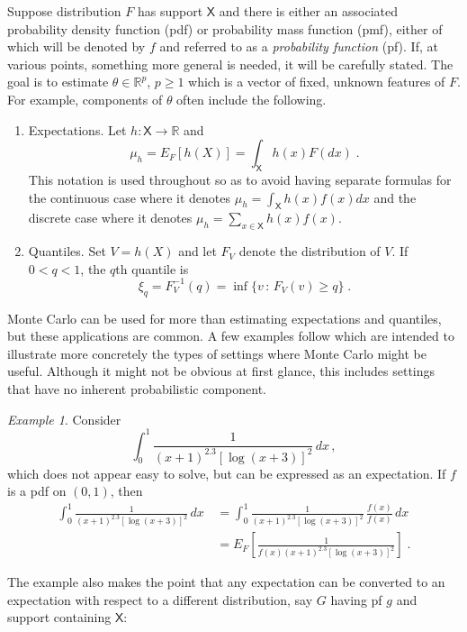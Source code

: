 \documentclass[12pt]{article}
\theoremstyle{plain}
\theoremstyle{definition}
\theoremstyle{remark}
\newtheorem{example}{Example}[section]
\newcommand{\sX}{\mathsf{X}}
\newcommand{\real}{\mathbb{R}}
\begin{document}
Suppose distribution $F$ has support $\sX$ and there is either an
associated probability density function (pdf) or probability mass
function (pmf), either of which will be denoted by $f$ and referred to
as a \textit{probability function} (pf).  If, at various points,
something more general is needed, it will be carefully stated.  The
goal is to estimate $\theta \in \mathbb{R}^p$, $p \ge 1$ which is a
vector of fixed, unknown features of $F$.  For example, components of
$\theta$ often include the following.
\begin{enumerate}
\item Expectations.  Let $h : \sX \to \real$ and 
\[
\mu_h = E_{F}[h(X)] = \int_{\sX} h(x) F(dx) \; .
\]
This notation is used throughout so as to avoid having
separate formulas for the continuous case where it denotes $\mu_{h} =
\int_{\sX} h(x) f(x) dx$ and the discrete case where it denotes
$\mu_{h} = \sum_{x \in \sX} h(x) f(x)$.

\item Quantiles.  Set $V=h(X)$ and let $F_V$ denote the distribution
  of $V$.  If $0 < q < 1$, the $q$th quantile is
\[
\xi_{q} = F_{V}^{-1}(q) = \inf \{ v \, : \, F_{V}(v) \ge q\} \; .
\]

\end{enumerate}
Monte Carlo can be used for more than estimating expectations and
quantiles, but these applications are common.  A few examples follow
which are intended to illustrate more concretely the types of
settings where Monte Carlo might be useful.  Although it might not be
obvious at first glance, this includes settings that have no inherent
probabilistic component.

\begin{example}
\label{gofmc:ex:integral}
Consider
\[
\int_{0}^{1} \frac{1}{(x+1)^{2.3} [\log ( x+3)]^{2}}\,  dx \, ,
\]
which does not appear easy to solve, but can be expressed as an
expectation.  If $f$ is a pdf on $(0,1)$, then
\begin{align*}
\int_{0}^{1} \frac{1}{(x+1)^{2.3} [\log ( x+3)]^{2}}\, dx \, & =
\int_{0}^{1} \frac{1}{(x+1)^{2.3} [\log ( x+3)]^{2}}\, \frac{f(x)}{f(x)} 
\, dx \\
& = E_{F}  \left[ \frac{1}{ f(x) (x+1)^{2.3} [\log ( x+3)]^{2}} \right]
\; .
\end{align*}
\end{example}

The example also makes the point that any expectation can be converted
to an expectation with respect to a different distribution, say $G$
having pf $g$ and support containing $\sX$:
\end{document}
